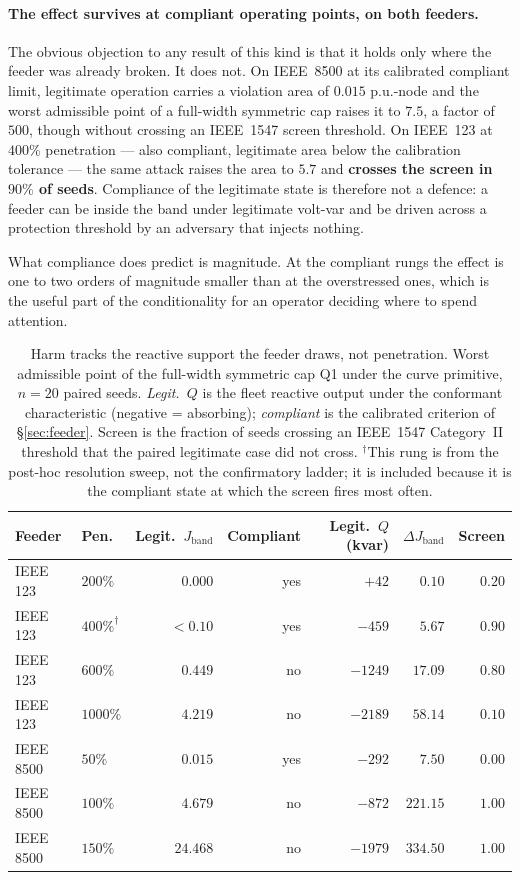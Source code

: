 \paragraph{The effect survives at compliant operating points, on both feeders.} The obvious
objection to any result of this kind is that it holds only where the feeder was already broken. It
does not. On IEEE~8500 at its calibrated compliant limit, legitimate operation carries a violation
area of $0.015$ p.u.-node and the worst admissible point of a full-width symmetric cap raises it to
$7.5$, a factor of $500$, though without crossing an IEEE~1547 screen threshold. On IEEE~123 at
$400\%$ penetration --- also compliant, legitimate area below the calibration tolerance --- the same
attack raises the area to $5.7$ and \textbf{crosses the screen in $90\%$ of seeds}. Compliance of
the legitimate state is therefore not a defence: a feeder can be inside the band under legitimate
volt-var and be driven across a protection threshold by an adversary that injects nothing.

What compliance does predict is magnitude. At the compliant rungs the effect is one to two orders
of magnitude smaller than at the overstressed ones, which is the useful part of the conditionality
for an operator deciding where to spend attention.

\begin{table}[t]
\centering
\caption{Harm tracks the reactive support the feeder draws, not penetration. Worst admissible
point of the full-width symmetric cap Q1 under the curve primitive, $n{=}20$ paired seeds.
\emph{Legit.\ $Q$} is the fleet reactive output under the conformant characteristic (negative =
absorbing); \emph{compliant} is the calibrated criterion of \S\ref{sec:feeder}. Screen is the
fraction of seeds crossing an IEEE~1547 Category~II threshold that the paired legitimate case did
not cross. $^{\dagger}$This rung is from the post-hoc resolution sweep, not the confirmatory
ladder; it is included because it is the compliant state at which the screen fires most often.}
\label{tab:reliance}
\small
\begin{tabular}{@{}llrrrrr@{}}
\toprule
Feeder & Pen. & Legit.\ $J_{\mathrm{band}}$ & Compliant & Legit.\ $Q$ (kvar) &
$\Delta J_{\mathrm{band}}$ & Screen \\
\midrule
IEEE 123  & $200\%$  & $0.000$  & yes & $+42$   & $0.10$   & $0.20$ \\
IEEE 123  & $400\%^{\dagger}$ & $<0.10$ & yes & $-459$  & $5.67$   & $0.90$ \\
IEEE 123  & $600\%$  & $0.449$  & no  & $-1249$ & $17.09$  & $0.80$ \\
IEEE 123  & $1000\%$ & $4.219$  & no  & $-2189$ & $58.14$  & $0.10$ \\
IEEE 8500 & $50\%$   & $0.015$  & yes & $-292$  & $7.50$   & $0.00$ \\
IEEE 8500 & $100\%$  & $4.679$  & no  & $-872$  & $221.15$ & $1.00$ \\
IEEE 8500 & $150\%$  & $24.468$ & no  & $-1979$ & $334.50$ & $1.00$ \\
\bottomrule
\end{tabular}
\end{table}

